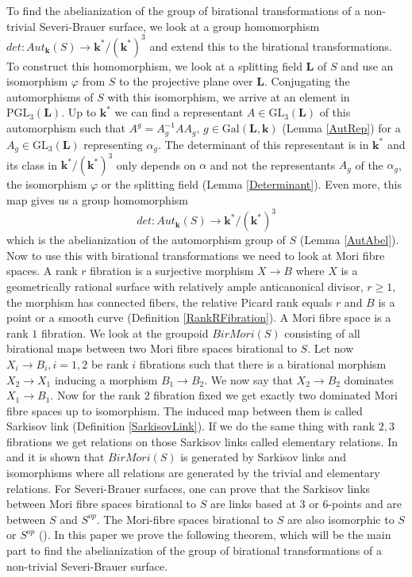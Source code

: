 \documentclass[12pt, oneside, reqno]{amsart}
\begin{document}
To find the abelianization of the group of birational transformations of a non-trivial Severi-Brauer surface, we look at a group homomorphism $det: Aut_{\textbf{k}}(S) \rightarrow \textbf{k}^* / (\textbf{k}^*)^3$ and extend this to the birational transformations. To construct this homomorphism, we look at a splitting field $\textbf{L}$ of $S$ and use an isomorphism $\varphi$ from $S$ to the projective plane over $\textbf{L}$. Conjugating the automorphisms of $S$ with this isomorphism, we arrive at an element in $\textrm{PGL}_3(\textbf{L})$. Up to $\textbf{k}^*$ we can find a representant $A \in \textrm{GL}_3(\textbf{L})$ of this automorphism such that $A^g = A_g^{-1}AA_g, \,g \in \textrm{Gal}(\textbf{L},\textbf{k})$ (Lemma \ref{AutRep}) for a $A_g \in \textrm{GL}_3(\textbf{L})$ representing $\alpha_g$. The determinant of this representant is in $\textbf{k}^*$ and its class in $\textbf{k}^*/(\textbf{k}^*)^3$ only depends on $\alpha$ and not the representants $A_g$ of the $\alpha_g$, the isomorphism $\varphi$ or the splitting field (Lemma \ref{Determinant}). Even more, this map gives us a group homomorphism \[det: Aut_{\textbf{k}}(S) \rightarrow \textbf{k}^*/(\textbf{k}^*)^3\] which is the abelianization of the automorphism group of $S$ (Lemma \ref{AutAbel}). Now to use this with birational transformations we need to look at Mori fibre spaces. A rank $r$ fibration is a surjective morphism $X \rightarrow B$ where $X$ is a geometrically rational surface with relatively ample anticanonical divisor, $r \geq 1$, the morphism has connected fibers, the relative Picard rank equals $r$ and $B$ is a point or a smooth curve (Definition \ref{RankRFibration}). A Mori fibre space is a rank $1$ fibration. We look at the groupoid $BirMori(S)$ consisting of all birational maps between two Mori fibre spaces birational to $S$. Let now $X_i \rightarrow B_i, i=1,2$ be rank $i$ fibrations such that there is a birational morphism $X_2 \rightarrow X_1$ inducing a morphism $B_1 \rightarrow B_2$. We now say that $X_2 \rightarrow B_2$ dominates $X_1 \rightarrow B_1$. Now for the rank $2$ fibration fixed we get exactly two dominated Mori fibre spaces up to isomorphism. The induced map between them is called Sarkisov link (Definition \ref{SarkisovLink}). If we do the same thing with rank $2,3$ fibrations we get relations on those Sarkisov links called elementary relations. In \cite{Iskovskikh} and \cite{Lamy_2020} it is shown that $BirMori(S)$ is generated by Sarkisov links and isomorphisms where all relations are generated by the trivial and elementary relations. For Severi-Brauer surfaces, one can prove that the Sarkisov links between Mori fibre spaces birational to $S$ are links based at $3$ or $6$-points and are between $S$ and $S^{op}$. The Mori-fibre spaces birational to $S$ are also isomorphic to $S$ or $S^{op}$ (\cite{BSY}). In this paper we prove the following theorem, which will be the main part to find the abelianization of the group of birational transformations of a non-trivial Severi-Brauer surface.
\end{document}
